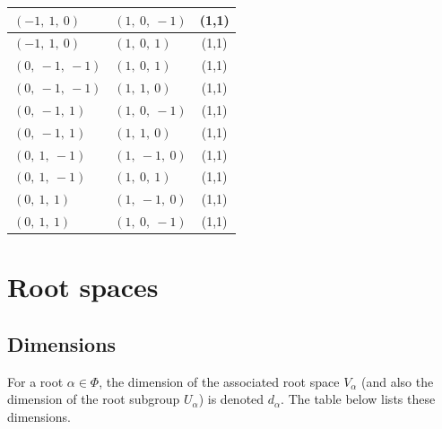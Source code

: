 \documentclass[11pt]{article}
\theoremstyle{definition}
\begin{document}
\begin{longtable}{|l|l|c|}
    \hline
    $\left( -1, \  1, \  0\right)$ & $\left( 1, \  0, \  -1\right)$ & (1,1) \\
    \hline
    $\left( -1, \  1, \  0\right)$ & $\left( 1, \  0, \  1\right)$ & (1,1) \\
    \hline
    $\left( 0, \  -1, \  -1\right)$ & $\left( 1, \  0, \  1\right)$ & (1,1) \\
    \hline
    $\left( 0, \  -1, \  -1\right)$ & $\left( 1, \  1, \  0\right)$ & (1,1) \\
    \hline
    $\left( 0, \  -1, \  1\right)$ & $\left( 1, \  0, \  -1\right)$ & (1,1) \\
    \hline
    $\left( 0, \  -1, \  1\right)$ & $\left( 1, \  1, \  0\right)$ & (1,1) \\
    \hline
    $\left( 0, \  1, \  -1\right)$ & $\left( 1, \  -1, \  0\right)$ & (1,1) \\
    \hline
    $\left( 0, \  1, \  -1\right)$ & $\left( 1, \  0, \  1\right)$ & (1,1) \\
    \hline
    $\left( 0, \  1, \  1\right)$ & $\left( 1, \  -1, \  0\right)$ & (1,1) \\
    \hline
    $\left( 0, \  1, \  1\right)$ & $\left( 1, \  0, \  -1\right)$ & (1,1) \\
    \hline
\end{longtable}

\fi

\newpage
\section{Root spaces}

\subsection{Dimensions}

For a root $\alpha \in \Phi$, the dimension of the associated root space $V_\alpha$ (and also the dimension of the root subgroup $U_\alpha$) is denoted $d_\alpha$. The table below lists these dimensions.

\bigskip
\end{document}
